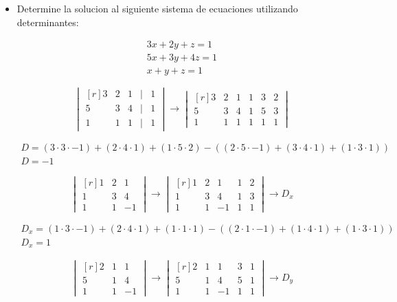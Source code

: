 \documentclass[a4paper, apacite, 12pt, doc]{apa6}
\begin{document}
\begin{itemize}
\item Determine la solucion al siguiente sistema de ecuaciones utilizando determinantes:

\begin{gather*}
3x + 2y + z = 1 \\
5x + 3y + 4z = 1 \\
x + y + z = 1
\end{gather*}

\[
	\begin{vmatrix*}[r]
		3 & 2 & 1 & | & 1 \\
		5 & 3& 4 &  | & 1 \\
		1 & 1& 1 & | & 1
	\end{vmatrix*}
	\rightarrow
	\begin{vmatrix*}[r]
		3 & 2 & 1 & 1 & 3 & 2 \\
		5 & 3 & 4 & 1 & 5 & 3 \\
		1 & 1 & 1 & 1 & 1 & 1
	\end{vmatrix*}
\]

\begin{gather*}
	D = (3 \cdot 3 \cdot -1) + (2 \cdot 4\cdot 1) + (1 \cdot 5 \cdot 2) -(
	( 2 \cdot 5 \cdot -1) + ( 3 \cdot 4 \cdot 1)+ ( 1 \cdot  3\cdot 1)) \\
	D = -1
\end{gather*}

\[
	\begin{vmatrix*}[r]
		1 & 2 & 1 \\
		1 & 3&  4 \\
		1 & 1& -1
	\end{vmatrix*}
	\rightarrow
	\begin{vmatrix*}[r]
		1 & 2 & 1 & 1 & 2\\
		1 & 3&  4 & 1 & 3\\
		1 & 1& -1 & 1 & 1
	\end{vmatrix*}
	\rightarrow D_x
	\]

\begin{gather*}
D_x = ( 1\cdot 3\cdot-1 ) + ( 2\cdot4 \cdot1 ) + (1 \cdot1 \cdot1 )
	-(( 2\cdot 1\cdot -1) + ( 1\cdot4 \cdot1 ) + (1 \cdot 3 \cdot 1 )) \\
D_x = 1
\end{gather*}




\[
	\begin{vmatrix*}[r]
		2 & 1 & 1 \\
		5 & 1&  4 \\
		1 & 1& -1
	\end{vmatrix*}
	\rightarrow
	\begin{vmatrix*}[r]
		2 & 1 & 1 & 3 & 1\\
		5 & 1&  4 & 5 & 1\\
		1 & 1& -1 & 1 & 1
	\end{vmatrix*}
	\rightarrow
	D_y
\]


\end{itemize}
\end{document}
